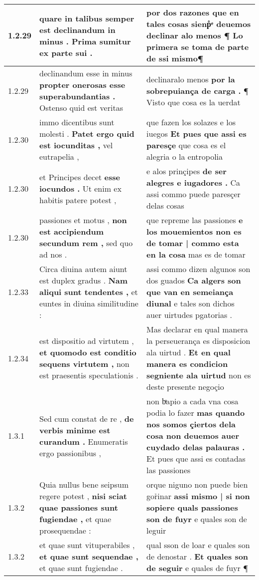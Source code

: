 \begin{tabular}{|p{1cm}|p{6.5cm}|p{6.5cm}|}
1.2.29 & quare in talibus \textbf{ semper est declinandum in minus . } Prima sumitur ex parte sui . & por dos razones que en tales cosas sienp̊ͤ \textbf{ deuemos declinar alo menos ¶ } Lo primera se toma de parte de ssi mismo¶ \\\hline
1.2.29 & declinandum esse in minus \textbf{ propter onerosas esse superabundantias . } Ostenso quid est veritas & declinaralo menos \textbf{ por la sobrepuiança de carga . } ¶ Visto que cosa es la uerdat \\\hline
1.2.30 & immo dicentibus sunt molesti . \textbf{ Patet ergo quid est iocunditas , } vel eutrapelia , & que fazen los solazes e los iuegos \textbf{ Et pues que assi es paresçe } que cosa es el alegria o la entropolia \\\hline
1.2.30 & et Principes decet \textbf{ esse iocundos . } Ut enim ex habitis patere potest , & e alos prinçipes \textbf{ de ser alegres e iugadores . } Ca assi commo puede paresçer delas cosas \\\hline
1.2.30 & passiones et motus , \textbf{ non est accipiendum secundum rem , } sed quo ad nos . & que repreme las passiones \textbf{ e los mouemientos non es de tomar | commo esta en la cosa } mas es de tomar \\\hline
1.2.33 & Circa diuina autem aiunt est duplex gradus . \textbf{ Nam aliqui sunt tendentes , } et euntes in diuina similitudine : & assi commo dizen algunos son dos guados \textbf{ Ca algers son que van en semeiança diunal } e tales son dichos auer uirtudes pgatorias . \\\hline
1.2.34 & est dispositio ad virtutem , \textbf{ et quomodo est conditio sequens virtutem , } non est praesentis speculationis . & Mas declarar en qual manera la perseuerança es disposicion ala uirtud . \textbf{ Et en qual manera es condicion segniente ala uirtud } non es deste presente negoçio \\\hline
1.3.1 & Sed cum constat de re , \textbf{ de verbis minime est curandum . } Enumeratis ergo passionibus , & non bͤapio a cada vna cosa podia lo fazer \textbf{ mas quando nos somos çiertos dela cosa non deuemos auer cuydado delas palauras . } Et pues que assi es contadas las passiones \\\hline
1.3.2 & Quia nullus bene seipsum regere potest , \textbf{ nisi sciat quae passiones sunt fugiendae , } et quae prosequendae : & orque niguno non puede bien gor̉inar \textbf{ assi mismo | si non sopiere quals passiones son de fuyr } e quales son de leguir \\\hline
1.3.2 & et quae sunt vituperabiles , \textbf{ et quae sunt sequendae , } et quae sunt fugiendae . & qual sson de loar e quales son de denostar . \textbf{ Et quales son de seguir } e quales de fuyr ¶ \\\hline

\end{tabular}
